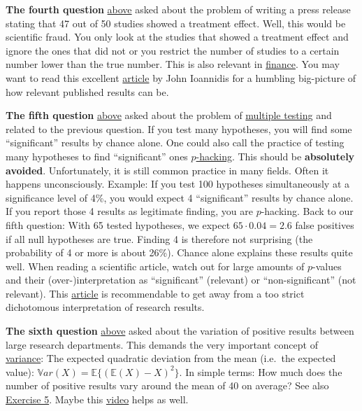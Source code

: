 \documentclass[
]{book}
\begin{document}
\textbf{The fourth question} \hyperref[Questions_about_the_1000-researcher_experiment]{above}
asked about the problem of writing a press release stating that 47 out of 50 studies showed a treatment effect.
Well, this would be scientific fraud.
You only look at the studies that showed a treatment effect and ignore the ones that did not or you restrict the number of studies to a certain number lower than the true number.
This is also relevant in \href{https://www.investopedia.com/terms/s/survivorship-bias-risk.asp\#:~:text=This\%20risk\%20arises\%20from\%20focusing,or\%20removed\%20from\%20performance\%20data.}{finance}.
You may want to read this excellent \href{https://journals.plos.org/plosmedicine/article?id=10.1371/journal.pmed.0020124}{article} by John Ioannidis for a humbling big-picture of how relevant published results can be.

\textbf{The fifth question} \hyperref[Questions_about_the_1000-researcher_experiment]{above}
asked about the problem of \href{https://en.wikipedia.org/wiki/Multiple_comparisons_problem}{multiple testing} and related to the previous question.
If you test many hypotheses, you will find some ``significant'' results by chance alone.
One could also call the practice of testing many hypotheses to find ``significant'' ones \href{https://en.wikipedia.org/wiki/Data_dredging}{\(p\)-hacking}.
This should be \textbf{absolutely avoided}. Unfortunately, it is still common practice in many fields. Often it happens unconsciously.
Example: If you test 100 hypotheses simultaneously at a significance level of 4\%, you would expect 4 ``significant'' results by chance alone.
If you report those 4 results as legitimate finding, you are \(p\)-hacking. Back to our fifth question: With 65 tested hypotheses, we expect \(65 \cdot 0.04 = 2.6\) false positives if all null hypotheses are true. Finding 4 is therefore not surprising (the probability of 4 or more is about 26\%). Chance alone explains these results quite well. When reading a scientific article, watch out for large amounts of \(p\)-values and
their (over-)interpretation as ``significant'' (relevant) or ``non-significant'' (not relevant).
This \href{https://www.tandfonline.com/doi/full/10.1080/00031305.2019.1583913}{article} is recommendable to get away from a too strict dichotomous interpretation of research results.

\textbf{The sixth question} \hyperref[Questions_about_the_1000-researcher_experiment]{above}
asked about the variation of positive results between large research departments. This demands the very important concept of \href{https://en.wikipedia.org/wiki/Variance}{variance}:
The expected quadratic deviation from the mean (i.e.~the expected value): \(\mathbb{V}ar(X) = \mathbb{E} \{ (\mathbb{E}(X) - X)^2 \}\). In simple terms:
How much does the number of positive results vary around the mean of 40 on average?
See also \hyperref[exercise5]{Exercise 5}. Maybe this \href{https://www.youtube.com/watch?v=SzZ6GpcfoQY}{video} helps as well.
\end{document}
